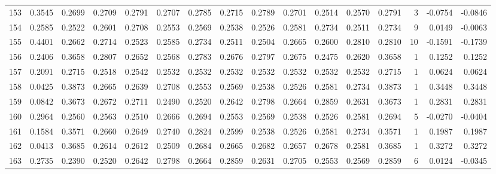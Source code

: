 \begin{tabular}{lrrrrrrrrrrrrrrr}
153 &      0.3545 &  0.2699 &  0.2709 &  0.2791 &  0.2707 &  0.2785 &  0.2715 &  0.2789 &  0.2701 &  0.2514 &   0.2570 &     0.2791 &      3 &                   -0.0754 &                    -0.0846 \\
154 &      0.2585 &  0.2522 &  0.2601 &  0.2708 &  0.2553 &  0.2569 &  0.2538 &  0.2526 &  0.2581 &  0.2734 &   0.2511 &     0.2734 &      9 &                    0.0149 &                    -0.0063 \\
155 &      0.4401 &  0.2662 &  0.2714 &  0.2523 &  0.2585 &  0.2734 &  0.2511 &  0.2504 &  0.2665 &  0.2600 &   0.2810 &     0.2810 &     10 &                   -0.1591 &                    -0.1739 \\
156 &      0.2406 &  0.3658 &  0.2807 &  0.2652 &  0.2568 &  0.2783 &  0.2676 &  0.2797 &  0.2675 &  0.2475 &   0.2620 &     0.3658 &      1 &                    0.1252 &                     0.1252 \\
157 &      0.2091 &  0.2715 &  0.2518 &  0.2542 &  0.2532 &  0.2532 &  0.2532 &  0.2532 &  0.2532 &  0.2532 &   0.2532 &     0.2715 &      1 &                    0.0624 &                     0.0624 \\
158 &      0.0425 &  0.3873 &  0.2665 &  0.2639 &  0.2708 &  0.2553 &  0.2569 &  0.2538 &  0.2526 &  0.2581 &   0.2734 &     0.3873 &      1 &                    0.3448 &                     0.3448 \\
159 &      0.0842 &  0.3673 &  0.2672 &  0.2711 &  0.2490 &  0.2520 &  0.2642 &  0.2798 &  0.2664 &  0.2859 &   0.2631 &     0.3673 &      1 &                    0.2831 &                     0.2831 \\
160 &      0.2964 &  0.2560 &  0.2563 &  0.2510 &  0.2666 &  0.2694 &  0.2553 &  0.2569 &  0.2538 &  0.2526 &   0.2581 &     0.2694 &      5 &                   -0.0270 &                    -0.0404 \\
161 &      0.1584 &  0.3571 &  0.2660 &  0.2649 &  0.2740 &  0.2824 &  0.2599 &  0.2538 &  0.2526 &  0.2581 &   0.2734 &     0.3571 &      1 &                    0.1987 &                     0.1987 \\
162 &      0.0413 &  0.3685 &  0.2614 &  0.2612 &  0.2509 &  0.2684 &  0.2665 &  0.2682 &  0.2657 &  0.2678 &   0.2581 &     0.3685 &      1 &                    0.3272 &                     0.3272 \\
163 &      0.2735 &  0.2390 &  0.2520 &  0.2642 &  0.2798 &  0.2664 &  0.2859 &  0.2631 &  0.2705 &  0.2553 &   0.2569 &     0.2859 &      6 &                    0.0124 &                    -0.0345 \\

\end{tabular}
